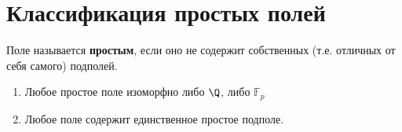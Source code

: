 \section{Классификация простых полей}
\begin{conj}
    Поле называется \textbf{простым}, если оно не содержит собственных (т.е. отличных от себя самого) подполей.
\end{conj}

\begin{theorem-non}
    \begin{enumerate}
        \item Любое простое поле изоморфно либо $\Q$, либо $\mathbb{F}_p$
        \item Любое поле содержит единственное простое подполе.
    \end{enumerate}
\end{theorem-non}
